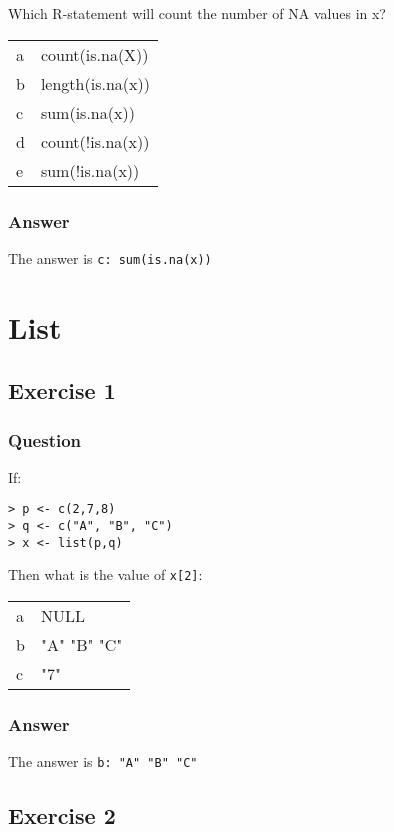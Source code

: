 \documentclass[11pt]{article}
\begin{document}
Which R-statement will count the number of NA values in x?

\begin{center}
\begin{tabular}{ll}
a & count(is.na(X))\\
b & length(is.na(x))\\
c & sum(is.na(x))\\
d & count(!is.na(x))\\
e & sum(!is.na(x))\\
\end{tabular}
\end{center}

\subsubsection{Answer}
\label{sec:orgf7474d2}
The answer is \texttt{c: sum(is.na(x))}

\section{List}
\label{sec:org8ef270f}
\subsection{Exercise 1}
\label{sec:org60d1f90}
\subsubsection{Question}
\label{sec:org5cefb46}
If:
\begin{verbatim}
> p <- c(2,7,8)
> q <- c("A", "B", "C")
> x <- list(p,q)
\end{verbatim}

Then what is the value of \texttt{x[2]}:
\begin{center}
\begin{tabular}{ll}
a & NULL\\
b & "A" "B" "C"\\
c & "7"\\
\end{tabular}
\end{center}

\subsubsection{Answer}
\label{sec:orga86f3b3}
The answer is \texttt{b: "A" "B" "C"}

\subsection{Exercise 2}
\label{sec:org50552bd}
\end{document}
